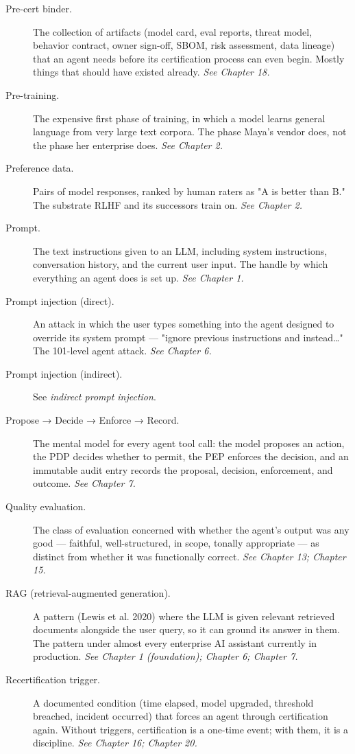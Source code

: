 \begin{description}
  \item[Pre-cert binder.] The collection of artifacts (model card, eval reports, threat model, behavior contract, owner sign-off, SBOM, risk assessment, data lineage) that an agent needs before its certification process can even begin. Mostly things that should have existed already. \textit{See Chapter 18.}
  \item[Pre-training.] The expensive first phase of training, in which a model learns general language from very large text corpora. The phase Maya's vendor does, not the phase her enterprise does. \textit{See Chapter 2.}
  \item[Preference data.] Pairs of model responses, ranked by human raters as "A is better than B." The substrate RLHF and its successors train on. \textit{See Chapter 2.}
  \item[Prompt.] The text instructions given to an LLM, including system instructions, conversation history, and the current user input. The handle by which everything an agent does is set up. \textit{See Chapter 1.}
  \item[Prompt injection (direct).] An attack in which the user types something into the agent designed to override its system prompt — "ignore previous instructions and instead…" The 101-level agent attack. \textit{See Chapter 6.}
  \item[Prompt injection (indirect).] See \textit{indirect prompt injection}.
  \item[Propose → Decide → Enforce → Record.] The mental model for every agent tool call: the model proposes an action, the PDP decides whether to permit, the PEP enforces the decision, and an immutable audit entry records the proposal, decision, enforcement, and outcome. \textit{See Chapter 7.}
  \item[Quality evaluation.] The class of evaluation concerned with whether the agent's output was any good — faithful, well-structured, in scope, tonally appropriate — as distinct from whether it was functionally correct. \textit{See Chapter 13; Chapter 15.}
  \item[RAG (retrieval-augmented generation).] A pattern (Lewis et al. 2020) where the LLM is given relevant retrieved documents alongside the user query, so it can ground its answer in them. The pattern under almost every enterprise AI assistant currently in production. \textit{See Chapter 1 (foundation); Chapter 6; Chapter 7.}
  \item[Recertification trigger.] A documented condition (time elapsed, model upgraded, threshold breached, incident occurred) that forces an agent through certification again. Without triggers, certification is a one-time event; with them, it is a discipline. \textit{See Chapter 16; Chapter 20.}

\end{description}
